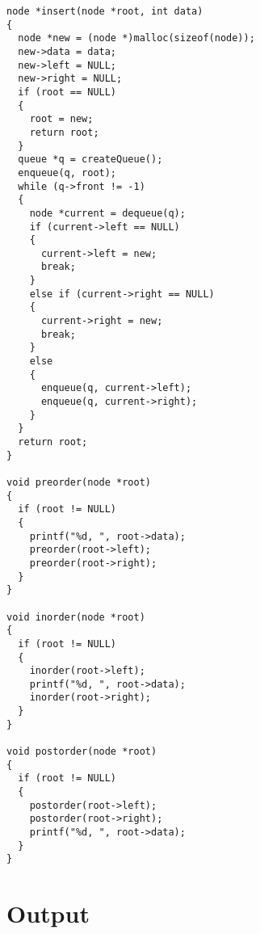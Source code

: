 \begin{lstlisting}[label={list:first}]
node *insert(node *root, int data)
{
  node *new = (node *)malloc(sizeof(node));
  new->data = data;
  new->left = NULL;
  new->right = NULL;
  if (root == NULL)
  {
    root = new;
    return root;
  }
  queue *q = createQueue();
  enqueue(q, root);
  while (q->front != -1)
  {
    node *current = dequeue(q);
    if (current->left == NULL)
    {
      current->left = new;
      break;
    }
    else if (current->right == NULL)
    {
      current->right = new;
      break;
    }
    else
    {
      enqueue(q, current->left);
      enqueue(q, current->right);
    }
  }
  return root;
}

void preorder(node *root)
{
  if (root != NULL)
  {
    printf("%d, ", root->data);
    preorder(root->left);
    preorder(root->right);
  }
}

void inorder(node *root)
{
  if (root != NULL)
  {
    inorder(root->left);
    printf("%d, ", root->data);
    inorder(root->right);
  }
}

void postorder(node *root)
{
  if (root != NULL)
  {
    postorder(root->left);
    postorder(root->right);
    printf("%d, ", root->data);
  }
}
\end{lstlisting}


\section*{Output}

